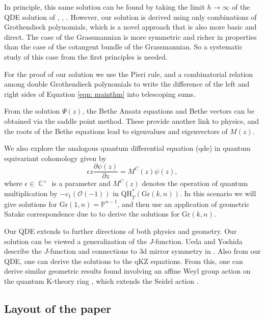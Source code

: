 \documentclass[12pt]{article}
\DeclareMathOperator{\C}{\mathbb{C}}
\theoremstyle{plain}
\theoremstyle{definition}
\begin{document}
In principle, this same solution can be found by taking the limit $h\to \infty$ of the QDE solution of \cite{rimanyitarasovvarchenko}, \cite{aganagic2017quasimapcountsbetheeigenfunctions}, \cite{pushkarsmirnovzeitlin}. However, our solution is derived using only combinations of Grothendieck polynomials, which is a novel approach that is also more basic and direct. The case of the Grassmannian is more symmetric and richer in properties than the case of the cotangent bundle of the Grassmannian. So a systematic study of this case from the first principles is needed. 

For the proof of our solution we use the Pieri rule, and a combinatorial relation among double Grothendieck polynomials to write the difference of the left and right sides of Equation \ref{eqn: mainthm} into telescoping sums.


From the solution $\Psi(z)$, the Bethe Ansatz equations and Bethe vectors can be obtained via the saddle point method. These provide another link to physics, and the roots of the Bethe equations lead to eigenvalues and eigenvectors of $M(z)$.

We also explore the analogous quantum differential equation (qde) in quantum equivariant cohomology given by
\begin{equation}
    \epsilon z\frac{\partial \psi(z)}{\partial z} = M^{C } (z) \psi(z),
\end{equation}
where $\epsilon \in \C^\times$ is a parameter and $M^C (z)$ denotes the operation of quantum multiplication by $-c_1 (\mathcal O(-1))$ in $\mathrm{QH}_{T}^* (\textrm{Gr}(k,n))$. In this scenario we will give solutions for $\textrm{Gr}(1,n) = \mathbb P^{n-1}$, and then use an application of geometric Satake correspondence due to \cite{cotti2024satakecorrespondenceequivariantquantum} to derive the solutions for $\textrm{Gr}(k,n)$. 

Our QDE extends to further directions of both physics and geometry. Our solution can be viewed a generalization of the $J$-function. Ueda and Yoshida describe the $J$-function and connections to 3d mirror symmetry in \cite{ueda3d}. Also from our QDE, one can derive the solutions to the qKZ equations. From this, one can derive similar geometric results found involving an affine Weyl group action on the quantum K-theory ring \cite{gorbounov2025quantumktheorygrassmanniansyangbaxter}, which extends the Seidel action \cite{LLSYseidel}. 


\subsection{Layout of the paper}
\end{document}
